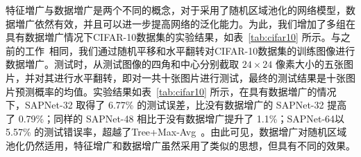 特征増广与数据増广是两个不同的概念，对于采用了随机区域池化的网络模型，数据増广依然有效，并且可以进一步提高网络的泛化能力。为此，我们增加了多组在具有数据増广情况下CIFAR-10数据集的实验结果，如表~\ref{tab:cifar10} 所示。与之前的工作~\cite{goodfellow2013maxout,springenberg2013improving,stollenga2014deep,wan2013regularization,DBLP:journals/corr/LinCY13,lee2014deeply,liang2015recurrent,srivastava2015training,springenberg2014striving}相同，我们通过随机平移和水平翻转对CIFAR-10数据集的训练图像进行数据増广。测试时，从测试图像的四角和中心分别截取 $24\times24$ 像素大小的五张图片，并对其进行水平翻转，即对一共十张图片进行测试，最终的测试结果是十张图片预测概率的均值。实验结果如表~\ref{tab:cifar10} 所示，在具有数据増广的情况下，SAPNet-32 取得了 6.77\% 的测试误差，比没有数据增广的 SAPNet-32 提高了 0.79\%；同样的 SAPNet-48 相比于没有数据增广提升了 1.1\%；SAPNet-64以 5.57\% 的测试错误率，超越了Tree+Max-Avg~\cite{lee2015generalizing}。由此可见，数据增广对随机区域池化仍然适用，特征增广和数据增广虽然采用了类似的思想，但具有不同的效果。

